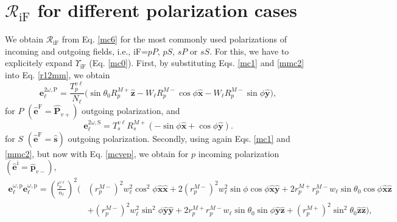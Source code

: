 
\section{\texorpdfstring{$\mathcal{R}_{\mathrm{iF}}$}{R} for different
polarization cases}\label{sec:rcases}

We obtain $\mathcal{R}_{\mathrm{iF}}$ from Eq. \eqref{mc6} for the most commonly used polarizations of incoming and outgoing fields, i.e., iF=$pP$, $pS$, $sP$ or $sS$. For this, we have to explicitely expand $\Upsilon_{\mathrm{iF}}$ (Eq. \eqref{mc0}). First, by substituting Eqs. \eqref{mc1} and \eqref{mmc2} into Eq. \eqref{r12mm}, we obtain
\begin{equation}\label{eq:e2wpmr}
\mathbf{e}^{2\omega,\mathrm{P}}_{\ell} =
\frac{T^{v\ell}_{p}}{N_{\ell}}
\big(
  \sin\theta_{0}R^{M+}_{p}\hat{\mathbf{z}}
- W_{\ell}R^{M-}_{p}\cos\phi\hat{\mathbf{x}}
- W_{\ell}R^{M-}_{p}\sin\phi\hat{\mathbf{y}}
\big),
\end{equation}
for $P$ $(\hat{\mathbf{e}}^{\mathrm{F}} = \hat{\mathbf{P}}_{v+})$ outgoing
polarization, and
\begin{equation}\label{eq:e2wsmr}
\mathbf{e}^{2\omega,\mathrm{S}}_{\ell} =
T_{s}^{v\ell}R^{M+}_{s}
\left(
- \sin\phi\hat{\mathbf{x}}
+ \cos\phi\hat{\mathbf{y}}
\right).
\end{equation}
for $S$ $(\hat{\mathbf{e}}^{\mathrm{F}}=\hat{\mathbf{s}})$ outgoing polarization. Secondly, using again Eqs. \eqref{mc1} and \eqref{mmc2}, but now with Eq. \eqref{mcvep}, we obtain for $p$ incoming polarization $(\hat{\mathbf{e}}^{\mathrm{i}} = \hat{\mathbf{p}}_{v-})$,
\begin{equation}\label{eq:ewewpmr}
\begin{split}
\mathbf{e}^{\omega,\mathrm{p}}_{\ell}\mathbf{e}^{\omega,\mathrm{p}}_{\ell} =
\left(\frac{t^{v\ell}_{p}}{n_{\ell}}\right)^{2}
\bigg(&
   \left(r^{M-}_{p}\right)^{2}w^{2}_{\ell}\cos^{2}\phi
   \hat{\mathbf{x}}\hat{\mathbf{x}}
 + 2\left(r^{M-}_{p}\right)^{2}w^{2}_{\ell}\sin\phi\cos\phi
   \hat{\mathbf{x}}\hat{\mathbf{y}}
 + 2r^{M+}_{p}r^{M-}_{p}w_{\ell}\sin\theta_{0}\cos\phi
   \hat{\mathbf{x}}\hat{\mathbf{z}}\\
&+ \left(r^{M-}_{p}\right)^{2}w^{2}_{\ell}\sin^{2}\phi
   \hat{\mathbf{y}}\hat{\mathbf{y}}
 + 2r^{M+}_{p}r^{M-}_{p}w_{\ell}\sin\theta_{0}\sin\phi
   \hat{\mathbf{y}}\hat{\mathbf{z}}
 + \left(r^{M+}_{p}\right)^{2}\sin^{2}\theta_{0}
   \hat{\mathbf{z}}\hat{\mathbf{z}}
\bigg),
\end{split}
\end{equation}
